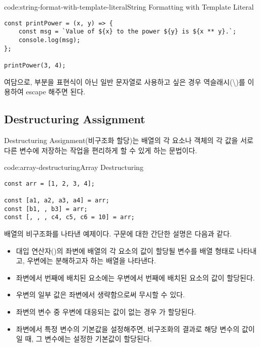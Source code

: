 \begin{codeenv}{code:string-format-with-template-literal}{String Formatting with Template Literal}\begin{verbatim}
const printPower = (x, y) => {
    const msg = `Value of ${x} to the power ${y} is ${x ** y}.`;
    console.log(msg);
};

printPower(3, 4);
\end{verbatim}
\end{codeenv}

여담으로, \cd{\$\{\}} 부분을 표현식이 아닌 일반 문자열로 사용하고 싶은 경우 역슬래시(\cd\textbackslash)를 이용하여 escape 해주면 된다.

\subsection*{Destructuring Assignment}

Destructuring Assignment(비구조화 할당)는 배열의 각 요소나 객체의 각 값을 서로 다른 변수에 저장하는 작업을 편리하게 할 수 있게 하는 문법이다.

\begin{codeenv}{code:array-destructuring}{Array Destructuring}\begin{verbatim}
const arr = [1, 2, 3, 4];

const [a1, a2, a3, a4] = arr;
const [b1, , b3] = arr;
const [, , , c4, c5, c6 = 10] = arr;
\end{verbatim}
\end{codeenv}

\은 배열의 비구조화를 나타낸 예제이다. 구문에 대한 간단한 설명은 다음과 같다.

\begin{itemize}
    \item 대입 연산자(\cd{=})의 좌변에 배열의 각 요소의 값이 할당될 변수를 배열 형태로 나타내고, 우변에는 분해하고자 하는 배열을 나타낸다.
    \item 좌변에서 번째에 배치된 요소에는 우변에서 번째에 배치된 요소의 값이 할당된다.
    \item 우변의 일부 값은 좌변에서 생략함으로써 무시할 수 있다.
    \item 좌변의 변수 중 우변에 대응되는 값이 없는 경우 가 할당된다.
    \item 좌변에서 특정 변수의 기본값을 설정해주면, 비구조화의 결과로 해당 변수의 값이 일 때, 그 변수에는 설정한 기본값이 할당된다.
\end{itemize}

